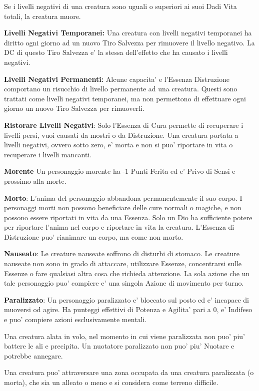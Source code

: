 \documentclass[a4paper,11pt,twoside,openany]{book}
\begin{document}
{Se i livelli negativi di una creatura sono uguali o superiori ai suoi Dadi Vita totali, la creatura muore.

\textbf{Livelli Negativi Temporanei:} Una creatura con livelli negativi temporanei ha diritto ogni giorno ad un nuovo Tiro Salvezza per rimuovere il livello negativo. La DC di questo Tiro Salvezza e' la stessa dell'effetto che ha causato i livelli negativi.

\textbf{Livelli Negativi Permanenti:} Alcune capacita' e l'Essenza Distruzione comportano un risucchio di livello permanente ad una creatura. Questi sono trattati come livelli negativi temporanei, ma non permettono di effettuare ogni giorno un nuovo Tiro Salvezza per rimuoverli. 

\textbf{Ristorare Livelli Negativi}: Solo l'Essenza di Cura permette di recuperare i livelli persi, vuoi causati da mostri o da Distruzione. Una creatura portata a livelli negativi, ovvero sotto zero, e' morta e non si puo' riportare in vita o recuperare i livelli mancanti.

\textbf{Morente} Un personaggio morente ha -1 Punti Ferita ed e' Privo di Sensi e prossimo alla morte.

\textbf{Morto}: L'anima del personaggio abbandona permanentemente il suo corpo. I personaggi morti non possono beneficiare delle cure normali o magiche, e non possono essere riportati in vita da una Essenza. Solo un Dio ha sufficiente potere per riportare l'anima nel corpo e riportare in vita la creatura. L'Essenza di Distruzione puo' rianimare un corpo, ma come non morto.

\textbf{Nauseato}: Le creature nauseate soffrono di disturbi di stomaco.
Le creature nauseate non sono in grado di attaccare, utilizzare Essenze, concentrarsi sulle Essenze o fare qualsiasi altra cosa che richieda attenzione. La sola azione che un tale personaggio puo' compiere e' una singola Azione di movimento per turno.

\textbf{Paralizzato}: Un personaggio paralizzato e' bloccato sul posto ed e' incapace di muoversi od agire. Ha punteggi effettivi di Potenza e Agilita' pari a 0, e' Indifeso e puo' compiere azioni esclusivamente mentali.

Una creatura alata in volo, nel momento in cui viene paralizzata non puo' piu' battere le ali e precipita. 
Un nuotatore paralizzato non puo' piu' Nuotare e potrebbe annegare. 

Una creatura puo' attraversare una zona occupata da una creatura paralizzata (o morta), che sia un alleato o meno e si considera come terreno difficile.

}
\end{document}
